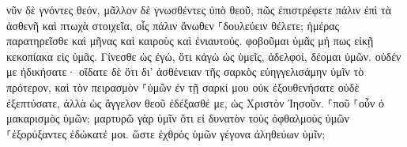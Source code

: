 \documentclass{openreader}
\begin{document}
νῦν δὲ γνόντες θεόν, μᾶλλον δὲ γνωσθέντες ὑπὸ θεοῦ, πῶς ἐπιστρέφετε πάλιν ἐπὶ τὰ ἀσθενῆ καὶ πτωχὰ στοιχεῖα, οἷς πάλιν ἄνωθεν ⸀δουλεύειν θέλετε; 
ἡμέρας παρατηρεῖσθε καὶ μῆνας καὶ καιροὺς καὶ ἐνιαυτούς. 
φοβοῦμαι ὑμᾶς μή πως εἰκῇ κεκοπίακα εἰς ὑμᾶς. 
Γίνεσθε ὡς ἐγώ, ὅτι κἀγὼ ὡς ὑμεῖς, ἀδελφοί, δέομαι ὑμῶν. οὐδέν με ἠδικήσατε· 
οἴδατε δὲ ὅτι δι’ ἀσθένειαν τῆς σαρκὸς εὐηγγελισάμην ὑμῖν τὸ πρότερον, 
καὶ τὸν πειρασμὸν ⸀ὑμῶν ἐν τῇ σαρκί μου οὐκ ἐξουθενήσατε οὐδὲ ἐξεπτύσατε, ἀλλὰ ὡς ἄγγελον θεοῦ ἐδέξασθέ με, ὡς Χριστὸν Ἰησοῦν. 
⸀ποῦ ⸀οὖν ὁ μακαρισμὸς ὑμῶν; μαρτυρῶ γὰρ ὑμῖν ὅτι εἰ δυνατὸν τοὺς ὀφθαλμοὺς ὑμῶν ⸀ἐξορύξαντες ἐδώκατέ μοι. 
ὥστε ἐχθρὸς ὑμῶν γέγονα ἀληθεύων ὑμῖν; 
\end{document}

